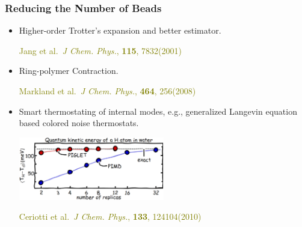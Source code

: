 \begin{frame}
  \frametitle{Reducing the Number of Beads}
  \begin{itemize}
  \item Higher-order Trotter's expansion and better estimator.

    \medskip
    \textcolor{olive}{
      Jang et al.\ \textit{J Chem. Phys.}, \textbf{115}, 7832(2001)
    }
  \item Ring-polymer Contraction.

    \medskip
    \textcolor{olive}{
      Markland et al.\ \textit{J Chem. Phys.}, \textbf{464}, 256(2008)
    }

  \item Smart thermostating of internal modes, e.g., generalized Langevin
equation based colored noise thermostats.

    \begin{center}
    \includegraphics[width=0.5\textwidth]{figs/piglet.pdf}
    \end{center}

    \medskip
    \textcolor{olive}{
      Ceriotti et al.\ \textit{J Chem. Phys.}, \textbf{133}, 124104(2010)
    }
  \end{itemize}
\end{frame}